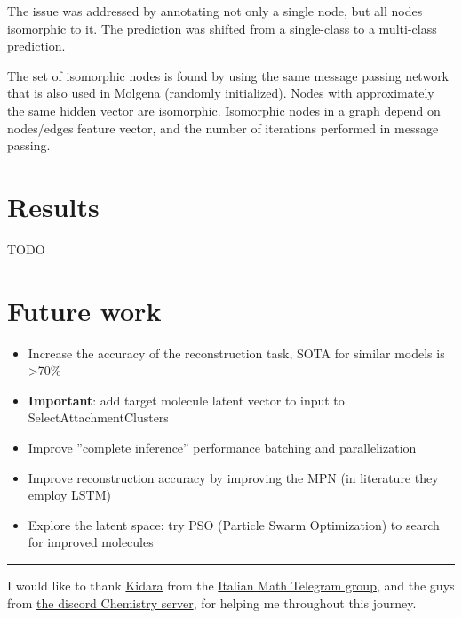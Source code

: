 \documentclass{article}
\begin{document}
The issue was addressed by annotating not only a single node, but all nodes isomorphic to it.
The prediction was shifted from a single-class to a multi-class prediction.

The set of isomorphic nodes is found by using the same message passing network that is also used in Molgena (randomly initialized).
Nodes with approximately the same hidden vector are isomorphic.
Isomorphic nodes in a graph depend on nodes/edges feature vector, and the number of iterations performed in message passing.

\section{Results}

TODO

\section{Future work}

\begin{itemize}
\item Increase the accuracy of the reconstruction task, SOTA for similar models is >70\%
\item \textbf{Important}: add target molecule latent vector to input to SelectAttachmentClusters
\item Improve ''complete inference'' performance batching and parallelization
\item Improve reconstruction accuracy by improving the MPN (in literature they employ LSTM)
\item Explore the latent space: try PSO (Particle Swarm Optimization) to search for improved molecules
\end{itemize}

\par\noindent\rule{\textwidth}{0.4pt}

I would like to thank \href{https://github.com/Kidara}{Kidara} from the \href{https://t.me/matematicaIT/369761}{Italian Math Telegram group},
and the guys from \href{https://discord.gg/jtD5nTyk}{the discord Chemistry server}, for helping me throughout this journey.
\end{document}

